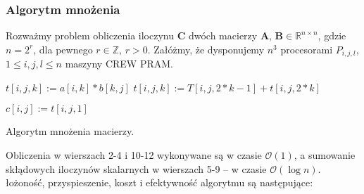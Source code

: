 

\subsubsection{Algorytm mnożenia}
Rozważmy problem obliczenia iloczynu \(\mathbf{C}\) dwóch macierzy \(\mathbf{A}\), \(\mathbf{B}\in\mathbb{R}^{n\times n}\), gdzie \(n=2^r\), dla pewnego \(r\in\mathbb{Z},\, r>0\). Załóżmy, że dysponujemy \(n^3\) procesorami \(P_{i,j,l}\), \(1\leq i, j, l \leq n\) maszyny CREW PRAM. 

\begin{algorithm}
\centering
\begin{algorithmic}[1]
\item[]
\State \(t[i,j,k] := a[i,k]*b[k,j]\)
\EndParFor
{} 
	\State \(t[i,j,k] := T[i,j,2*k-1]+t[i,j,2*k]\)
\EndParFor
\EndFor

\State \(c[i,j] := t[i,j,1] \)
\EndParFor
\end{algorithmic}
\caption{Algorytm mnożenia macierzy.\cite{Czech}}
\label{alg:pram_sum}
\end{algorithm}


Obliczenia w wierszach 2-4 i 10-12 wykonywane są w czasie \(\mathcal{O}(1)\), a sumowanie skłądowych iloczynów skalarnych w wierszach 5-9 – w czasie \(\mathcal{O}(\log{n})\). łożoność, przyspieszenie, koszt i efektywność algorytmu są następujące\cite{Czech}:

